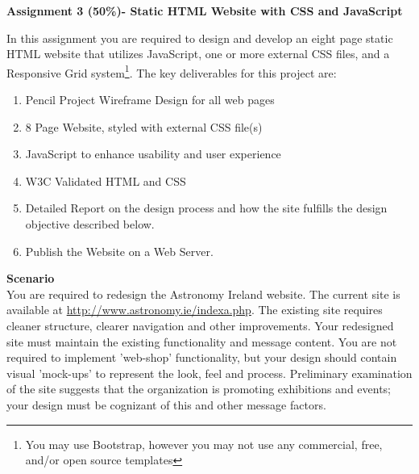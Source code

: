 
	
\begin{flushleft}
\Large\textbf{Assignment 3 (50\%)- Static HTML Website with CSS and JavaScript}\\
\end{flushleft}

In this assignment you are required to design and develop an eight page static HTML website that utilizes JavaScript, one or more external CSS files, and a Responsive Grid system\footnote{You may use Bootstrap, however you may not use any commercial, free, and/or open source templates}. The key deliverables for this project are:

\begin{enumerate}
	\item Pencil Project Wireframe Design for all web pages
	\item 8 Page Website, styled with external CSS file(s)
	\item JavaScript to enhance usability and user experience
	\item W3C Validated HTML and CSS
	\item Detailed Report on the design process and how the site fulfills the design objective described below.
	\item Publish the Website on a Web Server.
\end{enumerate}

\textbf{Scenario}\\

You are required to redesign the Astronomy Ireland website.  The current site is available at \href{http://www.astronomy.ie/indexa.php}{http://www.astronomy.ie/indexa.php}.  The existing site requires cleaner structure, clearer navigation and other improvements.  Your redesigned site must maintain the existing functionality and message content.  You are not required to implement 'web-shop' functionality, but your design should contain visual 'mock-ups' to represent the look, feel and process.  Preliminary examination of the site suggests that the organization is promoting exhibitions and events; your design must be cognizant of this and other message factors.



